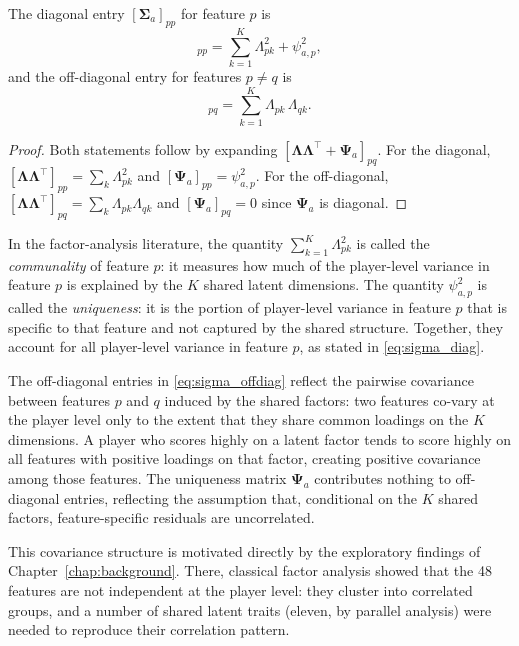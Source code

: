 \begin{proposition}
\label{prop:sigma_entries}
The diagonal entry $[\boldsymbol{\Sigma}_a]_{pp}$ for feature $p$ is
\begin{equation}
[\boldsymbol{\Sigma}_a]_{pp} = \sum_{k=1}^{K} \Lambda_{pk}^2 + \psi_{a,p}^2,
\label{eq:sigma_diag}
\end{equation}
and the off-diagonal entry for features $p \neq q$ is
\begin{equation}
[\boldsymbol{\Sigma}_a]_{pq} = \sum_{k=1}^{K} \Lambda_{pk}\,\Lambda_{qk}.
\label{eq:sigma_offdiag}
\end{equation}
\end{proposition}
\begin{proof}
Both statements follow by expanding $[\boldsymbol{\Lambda}\boldsymbol{\Lambda}^\top + \boldsymbol{\Psi}_a]_{pq}$. For the diagonal, $[\boldsymbol{\Lambda}\boldsymbol{\Lambda}^\top]_{pp} = \sum_k \Lambda_{pk}^2$ and $[\boldsymbol{\Psi}_a]_{pp} = \psi_{a,p}^2$. For the off-diagonal, $[\boldsymbol{\Lambda}\boldsymbol{\Lambda}^\top]_{pq} = \sum_k \Lambda_{pk}\Lambda_{qk}$ and $[\boldsymbol{\Psi}_a]_{pq} = 0$ since $\boldsymbol{\Psi}_a$ is diagonal.
\end{proof}

In the factor-analysis literature, the quantity $\sum_{k=1}^K \Lambda_{pk}^2$ is called the \emph{communality} of feature $p$: it measures how much of the player-level variance in feature $p$ is explained by the $K$ shared latent dimensions. The quantity $\psi_{a,p}^2$ is called the \emph{uniqueness}: it is the portion of player-level variance in feature $p$ that is specific to that feature and not captured by the shared structure. Together, they account for all player-level variance in feature $p$, as stated in \eqref{eq:sigma_diag}.

The off-diagonal entries in \eqref{eq:sigma_offdiag} reflect the pairwise covariance between features $p$ and $q$ induced by the shared factors: two features co-vary at the player level only to the extent that they share common loadings on the $K$ dimensions. A player who scores highly on a latent factor tends to score highly on all features with positive loadings on that factor, creating positive covariance among those features. The uniqueness matrix $\boldsymbol{\Psi}_a$ contributes nothing to off-diagonal entries, reflecting the assumption that, conditional on the $K$ shared factors, feature-specific residuals are uncorrelated.

This covariance structure is motivated directly by the exploratory findings of Chapter~\ref{chap:background}. There, classical factor analysis showed that the 48 features are not independent at the player level: they cluster into correlated groups, and a number of shared latent traits (eleven, by parallel analysis) were needed to reproduce their correlation pattern.

